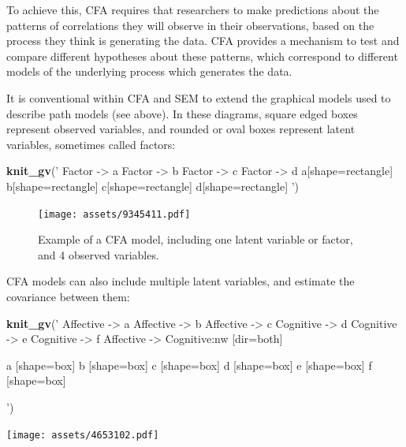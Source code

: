 \documentclass[]{article}
\newenvironment{Shaded}{\begin{snugshade}}{\end{snugshade}}
\newcommand{\KeywordTok}[1]{\textcolor[rgb]{0.13,0.29,0.53}{\textbf{#1}}}
\newcommand{\NormalTok}[1]{#1}
\newcommand{\StringTok}[1]{\textcolor[rgb]{0.31,0.60,0.02}{#1}}
\begin{document}
To achieve this, CFA requires that researchers to make predictions about the
patterns of correlations they will observe in their observations, based on the
process they think is generating the data. CFA provides a mechanism to test and
compare different hypotheses about these patterns, which correspond to different
models of the underlying process which generates the data.

It is conventional within CFA and SEM to extend the graphical models used to
describe path models (see above). In these diagrams, square edged boxes
represent observed variables, and rounded or oval boxes represent latent
variables, sometimes called factors:

\begin{Shaded}
\begin{Highlighting}[]
\KeywordTok{knit_gv}\NormalTok{(}\StringTok{'}
\StringTok{Factor -> a}
\StringTok{Factor -> b}
\StringTok{Factor -> c}
\StringTok{Factor -> d}
\StringTok{a[shape=rectangle]}
\StringTok{b[shape=rectangle]}
\StringTok{c[shape=rectangle]}
\StringTok{d[shape=rectangle]}
\StringTok{'}\NormalTok{)}
\end{Highlighting}
\end{Shaded}

\begin{figure}
\centering
\texttt{[image: assets/9345411.pdf]}
\caption{\label{fig:unnamed-chunk-12}Example of a CFA model, including one latent variable or factor, and 4 observed variables.}
\end{figure}

CFA models can also include multiple latent variables, and estimate the
covariance between them:

\begin{Shaded}
\begin{Highlighting}[]
\KeywordTok{knit_gv}\NormalTok{(}\StringTok{'}
\StringTok{        Affective -> a}
\StringTok{Affective -> b}
\StringTok{Affective -> c}
\StringTok{Cognitive -> d}
\StringTok{Cognitive -> e}
\StringTok{Cognitive -> f}
\StringTok{Affective -> Cognitive:nw [dir=both]}

\StringTok{a [shape=box]}
\StringTok{b [shape=box]}
\StringTok{c [shape=box]}
\StringTok{d [shape=box]}
\StringTok{e [shape=box]}
\StringTok{f [shape=box]}

\StringTok{'}\NormalTok{)}
\end{Highlighting}
\end{Shaded}

\texttt{[image: assets/4653102.pdf]}
\end{document}
